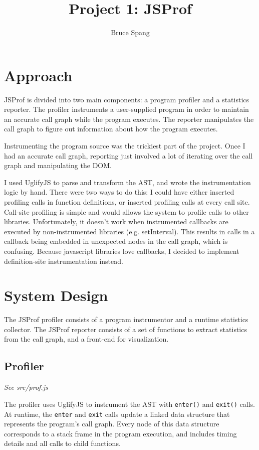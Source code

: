 \documentclass{article}
\begin{document}
\title{Project 1: JSProf}
\author{Bruce Spang}
\maketitle

\section*{Approach}

JSProf is divided into two main components: a program profiler and a statistics reporter. The profiler instruments a user-supplied program in order to maintain an accurate call graph while the program executes. The reporter manipulates the call graph to figure out information about how the program executes.

Instrumenting the program source was the trickiest part of the project. Once I had an accurate call graph, reporting just involved a lot of iterating over the call graph and manipulating the DOM.

I used UglifyJS \cite{uglify} to parse and transform the AST, and wrote the instrumentation logic by hand. There were two ways to do this: I could have either inserted profiling calls in function definitions, or inserted profiling calls at every call site. Call-site profiling is simple and would allows the system to profile calls to other libraries. Unfortunately, it doesn't work when instrumented callbacks are executed by non-instrumented libraries (e.g. setInterval). This results in calls in a callback being embedded in unexpected nodes in the call graph, which is confusing. Because javascript libraries love callbacks, I decided to implement definition-site instrumentation instead.

\section*{System Design}

The JSProf profiler consists of a program instrumentor and a runtime statistics collector. The JSProf reporter consists of a set of functions to extract statistics from the call graph, and a front-end for visualization.

\subsection*{Profiler}

\textit{See src/prof.js}

The profiler uses UglifyJS \cite{uglify} to instrument the AST with \texttt{enter()} and \texttt{exit()} calls. At runtime, the \texttt{enter} and \texttt{exit} calls update a linked data structure that represents the program's call graph. Every node of this data structure corresponds to a stack frame in the program execution, and includes timing details and all calls to child functions.
\end{document}
